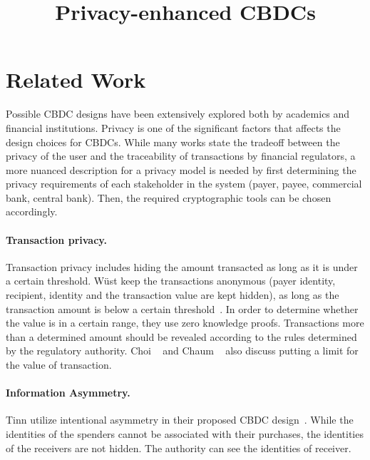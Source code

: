 \documentclass[runningheads]{llncs}
\begin{document}
%

\title{Privacy-enhanced CBDCs}
%
%
\author{}
%
%

%
\maketitle              %
%
\begin{abstract}


\keywords{}
\end{abstract}
%
%
%
\section{Related Work}
Possible CBDC designs have been extensively explored both by academics and financial institutions. Privacy is one of the significant factors that affects the design choices for CBDCs. While many works state the tradeoff between the privacy of the user and the traceability of transactions by financial regulators, a more nuanced description for a privacy model is needed by first determining the privacy requirements of each stakeholder in the system (\eg payer, payee, commercial bank, central bank). Then, the required cryptographic tools can be chosen accordingly. 


\paragraph{Transaction privacy.} Transaction privacy includes hiding the amount transacted as long as it is under a certain threshold. W{\"u}st \etal keep the transactions anonymous (payer identity, recipient, identity and the transaction value are kept hidden), as long as the transaction amount is below a certain threshold~\cite{WKCC18}. In order to determine whether the value is in a certain range, they use zero knowledge proofs. Transactions more than a determined amount should be revealed according to the rules determined by the regulatory authority. Choi \etal ~\cite{CHLRS21} and Chaum \etal ~\cite{CGM21} also discuss putting a limit for the value of transaction.

\paragraph{Information Asymmetry.} Tinn \etal utilize intentional asymmetry in their proposed CBDC design~\cite{TB21}. While the identities of the spenders cannot be associated with their purchases, the identities of the receivers are not hidden. The authority can see the identities of receiver.
\end{document}
